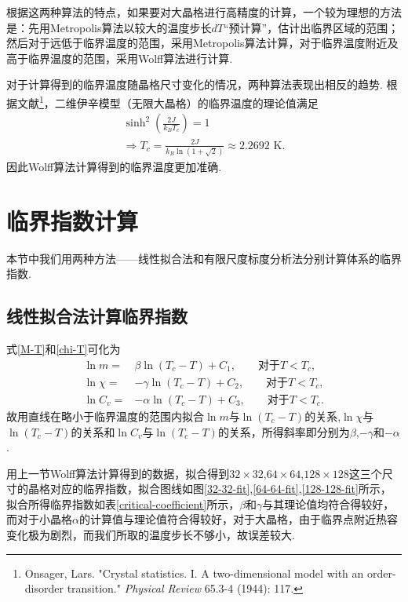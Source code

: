 \documentclass[UTF8,10pt,a4paper]{article}
\theoremstyle{Problem}
\theoremstyle{Solution}
\begin{document}
根据这两种算法的特点，如果要对大晶格进行高精度的计算，一个较为理想的方法是：先用Metropolis算法以较大的温度步长$dT$“预计算”，估计出临界区域的范围；然后对于远低于临界温度的范围，采用Metropolis算法计算，对于临界温度附近及高于临界温度的范围，采用Wolff算法进行计算.

对于计算得到的临界温度随晶格尺寸变化的情况，两种算法表现出相反的趋势. 根据文献\footnote{Onsager, Lars. "Crystal statistics. I. A two-dimensional model with an order-disorder transition." \textit{Physical Review} 65.3-4 (1944): 117.}，二维伊辛模型（无限大晶格）的临界温度的理论值满足
\begin{gather}
    \sinh^2\left(\frac{2J}{k_BT_c}\right)=1\\
    \Longrightarrow T_c=\frac{2J}{k_B\ln(1+\sqrt{2})}\approx 2.2692\text{ K}.
\end{gather}
因此Wolff算法计算得到的临界温度更加准确.

\clearpage

\section{临界指数计算}

本节中我们用两种方法——线性拟合法和有限尺度标度分析法分别计算体系的临界指数.

\subsection{线性拟合法计算临界指数}

式\eqref{M-T}和\eqref{chi-T}可化为
\begin{align}
    \ln m=&\beta\ln(T_c-T)+C_1,\qquad\text{对于}T<T_c,\\
    \ln\chi=&-\gamma\ln(T_c-T)+C_2,\qquad\text{对于}T<T_c,\\
    \ln C_v=&-\alpha\ln(T_c-T)+C_3,\qquad\text{对于}T<T_c.
\end{align}
故用直线在略小于临界温度的范围内拟合$\ln m$与$\ln(T_c-T)$的关系,$\ln\chi$与$\ln(T_c-T)$的关系和$\ln C_v$与$\ln(T_c-T)$的关系，所得斜率即分别为$\beta$,$-\gamma$和$-\alpha$.

用上一节Wolff算法计算得到的数据，拟合得到$32\times 32$,$64\times 64$,$128\times 128$这三个尺寸的晶格对应的临界指数，拟合图线如图\ref{32-32-fit},\ref{64-64-fit},\ref{128-128-fit}所示，拟合所得临界指数如表\ref{critical-coefficient}所示，$\beta$和$\gamma$与其理论值均符合得较好，而对于小晶格$\alpha$的计算值与理论值符合得较好，对于大晶格，由于临界点附近热容变化极为剧烈，而我们所取的温度步长不够小，故误差较大.
\end{document}
